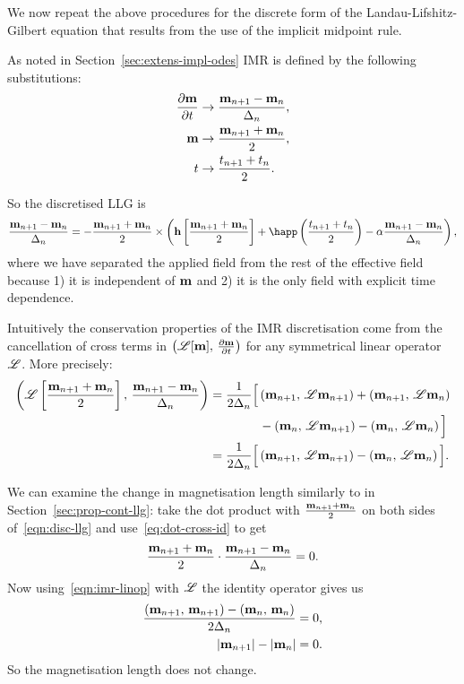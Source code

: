 We now repeat the above procedures for the discrete form of the Landau-Lifshitz-Gilbert equation that results from the use of the implicit midpoint rule.

As noted in Section~\ref{sec:extens-impl-odes} IMR is defined by the following substitutions:
\begin{align}
  \label{eq:55}
  \frac{\partial \mathbf{m}}{\partial t} &\rightarrow \frac{\mathbf{m}_{n+1} - \mathbf{m}_n}{\Delta_{n}}, \\
  \mathbf{m} &\rightarrow \frac{\mathbf{m}_{n+1} + \mathbf{m}_n}{2}, \\
  t &\rightarrow \frac{t_{n+1} + t_n}{2}.
\end{align}

So the discretised LLG is
\begin{equation}
  \frac{\mv_{n+1} - \mv_n}{\dtn} = - \frac{\mv_{n+1} + \mv_n}{2} \times
  \left(
  \hv \left[\frac{\mv_{n+1} + \mv_n}{2} \right]
  + \happ\left(\frac{t_{n+1} + t_n}{2}\right)
  - \dampc \frac{\mv_{n+1} - \mv_n}{\dtn}
  \right),
  \label{eqn:disc-llg}
\end{equation}
where we have separated the applied field from the rest of the effective field because 1) it is independent of $\mathbf{m}$ and 2) it is the only field with explicit time dependence.

Intuitively the conservation properties of the IMR discretisation come from the cancellation of cross terms in $\left(\mathscr{L}[\mathbf{m}],\, \frac{\partial \mathbf{m}}{\partial t} \right)$ for any symmetrical linear operator $\mathscr{L}$. More precisely:
\begin{equation}
  \begin{aligned}
    \label{eqn:imr-linop}
    \left(\mathscr{L} \left[ \frac{\mathbf{m}_{n+1} + \mathbf{m}_n}{2} \right],\,  \frac{\mathbf{m}_{n+1} - \mathbf{m}_n}{\Delta_{n}}  \right)
    &= \frac{1}{2\Delta_{n}} \Big[
      \left(\mathbf{m}_{n+1},\, \mathscr{L} \mathbf{m}_{n+1} \right) + \left(\mathbf{m}_{n+1},\, \mathscr{L} \mathbf{m}_{n} \right) \\
      & \qquad\qquad - \left(\mathbf{m}_{n},\, \mathscr{L} \mathbf{m}_{n+1} \right) - \left(\mathbf{m}_{n},\, \mathscr{L} \mathbf{m}_{n} \right)
      \Big] \\
    &= \frac{1}{2\Delta_{n}} \Big[
      \left(\mathbf{m}_{n+1},\, \mathscr{L} \mathbf{m}_{n+1} \right)
      - \left(\mathbf{m}_{n},\, \mathscr{L} \mathbf{m}_{n} \right)
      \Big].
  \end{aligned}
\end{equation}

We can examine the change in magnetisation length similarly to in Section~\ref{sec:prop-cont-llg}: take the dot product with $\frac{\mathbf{m}_{n+1} + \mathbf{m}_n}{2}$ on both sides of~\eqref{eqn:disc-llg} and use~\eqref{eq:dot-cross-id} to get
\begin{equation}
  \frac{\mathbf{m}_{n+1} + \mathbf{m}_n}{2} \cdot \frac{\mathbf{m}_{n+1} - \mathbf{m}_n}{\Delta_{n}} = 0.
\end{equation}
Now using~\eqref{eqn:imr-linop} with $\mathscr{L}$ the identity operator gives us
\begin{equation}
  \begin{aligned}
    \frac{\left(\mathbf{m}_{n+1},\, \mathbf{m}_{n+1} \right) - \left(\mathbf{m}_n,\, \mathbf{m}_n \right) }{2 \Delta_{n}} &= 0, \\
    \lvert \mathbf{m}_{n+1} \rvert - \lvert \mathbf{m}_n \rvert &= 0.
  \end{aligned}
\end{equation}
So the magnetisation length does not change.

